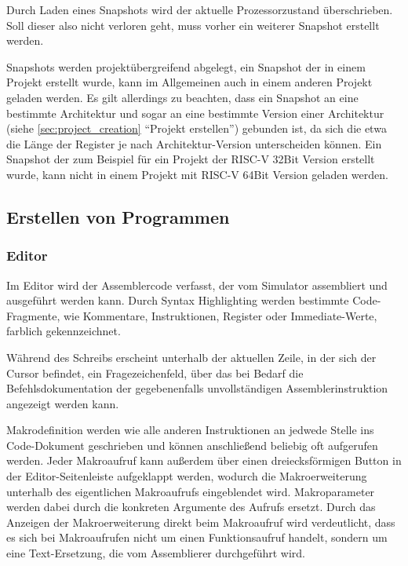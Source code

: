 \begin{warningblock}
Durch Laden eines Snapshots wird der aktuelle Prozessorzustand überschrieben. Soll dieser also nicht verloren geht, muss vorher ein weiterer Snapshot erstellt werden.
\end{warningblock}

Snapshots werden projektübergreifend abgelegt, ein Snapshot der in einem Projekt erstellt wurde, kann im Allgemeinen auch in einem anderen Projekt geladen werden. Es gilt allerdings zu beachten, dass ein Snapshot an eine bestimmte Architektur und sogar an eine bestimmte Version einer Architektur (siehe \ref{sec:project_creation} ``Projekt erstellen'') gebunden ist, da sich die etwa die Länge der Register je nach Architektur-Version unterscheiden können. Ein Snapshot der zum Beispiel für ein Projekt der RISC-V 32Bit Version erstellt wurde, kann nicht in einem Projekt mit RISC-V 64Bit Version geladen werden.

\subsection{Erstellen von Programmen}

\subsubsection{Editor}
\label{sec:Editor}

Im Editor wird der Assemblercode verfasst, der vom Simulator assembliert und ausgeführt werden kann.
Durch Syntax Highlighting werden bestimmte Code-Fragmente, wie Kommentare, Instruktionen,
Register oder Immediate-Werte, farblich gekennzeichnet.

Während des Schreibs erscheint unterhalb der aktuellen Zeile, in der sich der Cursor
befindet, ein Fragezeichenfeld, über das bei Bedarf die Befehlsdokumentation der
gegebenenfalls unvollständigen Assemblerinstruktion angezeigt werden kann.

Makrodefinition werden wie alle anderen Instruktionen an jedwede Stelle ins Code-Dokument geschrieben und können anschließend beliebig oft aufgerufen werden. Jeder Makroaufruf kann außerdem über einen dreiecksförmigen Button in der Editor-Seitenleiste aufgeklappt werden, wodurch die Makroerweiterung unterhalb des eigentlichen Makroaufrufs eingeblendet wird. Makroparameter werden dabei durch die konkreten Argumente des Aufrufs ersetzt. Durch das Anzeigen der Makroerweiterung direkt beim Makroaufruf wird verdeutlicht, dass es sich bei Makroaufrufen nicht um einen Funktionsaufruf handelt, sondern um eine Text-Ersetzung, die vom Assemblierer durchgeführt wird.

